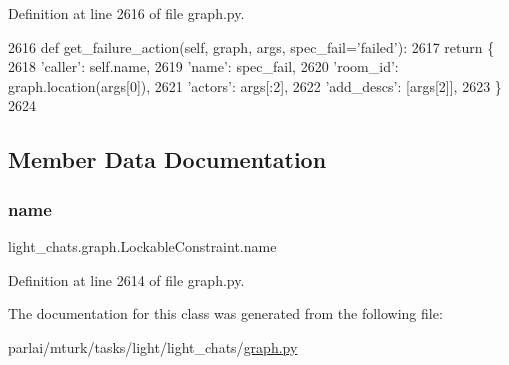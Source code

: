 Definition at line 2616 of file graph.\+py.


\begin{DoxyCode}
2616     \textcolor{keyword}{def }get\_failure\_action(self, graph, args, spec\_fail='failed'):
2617         \textcolor{keywordflow}{return} \{
2618             \textcolor{stringliteral}{'caller'}: self.name,
2619             \textcolor{stringliteral}{'name'}: spec\_fail,
2620             \textcolor{stringliteral}{'room\_id'}: graph.location(args[0]),
2621             \textcolor{stringliteral}{'actors'}: args[:2],
2622             \textcolor{stringliteral}{'add\_descs'}: [args[2]],
2623         \}
2624 
\end{DoxyCode}


\subsection{Member Data Documentation}
\mbox{\label{classlight__chats_1_1graph_1_1LockableConstraint_a9de4ab5a0b0434496da7971c7c015054}} 
\subsubsection{\texorpdfstring{name}{name}}
{\footnotesize\ttfamily light\+\_\+chats.\+graph.\+Lockable\+Constraint.\+name\hspace{0.3cm}{\ttfamily [static]}}



Definition at line 2614 of file graph.\+py.



The documentation for this class was generated from the following file\+:\begin{DoxyCompactItemize}
\item 
parlai/mturk/tasks/light/light\+\_\+chats/\hyperlink{parlai_2mturk_2tasks_2light_2light__chats_2graph_8py}{graph.\+py}\end{DoxyCompactItemize}
